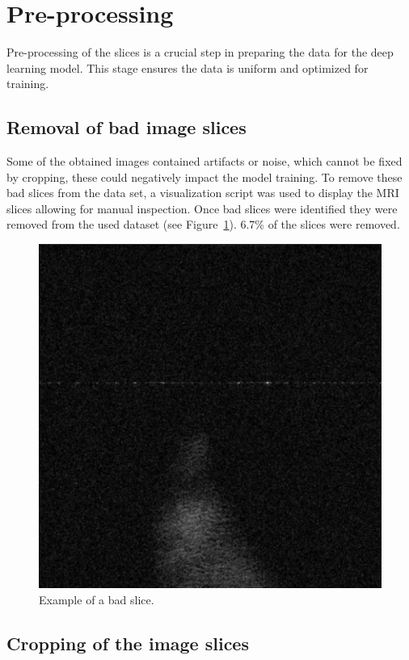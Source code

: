 \documentclass[twocolumn]{article}
\begin{document}
\section{Pre-processing}

Pre-processing of the slices is a crucial step in preparing the data for the deep learning model. This stage ensures the data is uniform and optimized for training. 

\subsection{Removal of bad image slices}

Some of the obtained images contained artifacts or noise, which cannot be fixed by cropping, these could negatively impact the model training. To remove these bad slices from the data set, a visualization script was used to display the MRI slices allowing for manual inspection. Once bad slices were identified they were removed from the used dataset (see Figure~\ref{fig:bad slice}). 6.7\% of the slices were removed.

\begin{figure}[H]
    \centering
    \includegraphics[width=0.8\linewidth]{bad_slice.png}
    \caption{Example of a bad slice.}
    \label{fig:bad slice}
\end{figure}

\subsection{Cropping of the image slices}
\end{document}
